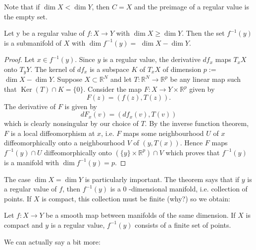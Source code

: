 \begin{remark}
    Note that if $\operatorname{dim} X<\operatorname{dim} Y$, then $C=X$ and the preimage of a regular value is the empty set.
\end{remark}

\begin{theorem}\label{thm:preimage}
    Let y be a regular value of $f: X \rightarrow Y$ with $\operatorname{dim} X \geq \operatorname{dim} Y$. Then the set $f^{-1}(y)$ is a submanifold of $X$ with $\operatorname{dim} f^{-1}(y)=$ $\operatorname{dim} X-\operatorname{dim} Y$.
\end{theorem}
\begin{proof}
    Let $x \in f^{-1}(y)$. Since $y$ is a regular value, the derivative $d f_{x}$ maps $T_{x} X$ onto $T_{y} Y$. The kernel of $d f_{x}$ is a subspace $K$ of $T_{x} X$ of dimension $p:=$ $\operatorname{dim} X-\operatorname{dim} Y$. Suppose $X \subset \mathbb{R}^{N}$ and let $T: \mathbb{R}^{N} \rightarrow \mathbb{R}^{p}$ be any linear map such that $\operatorname{Ker}(T) \cap K=\{0\}$. Consider the map $F: X \rightarrow Y \times \mathbb{R}^{p}$ given by
$$
F(z)=(f(z), T(z)).
$$
The derivative of $F$ is given by
$$
d F_{x}(v)=\left(d f_{x}(v), T(v)\right)
$$
which is clearly nonsingular by our choice of $T$. By the inverse function theorem, $F$ is a local diffeomorphism at $x$, i.e. $F$ maps some neighbourhood $U$ of $x$ diffeomorphically onto a neighbourhood $V$ of $(y, T(x))$. Hence $F$ maps $f^{-1}(y) \cap U$ diffeomorphically onto $\left(\{y\} \times \mathbb{R}^{p}\right) \cap V$ which proves that $f^{-1}(y)$ is a manifold with $\operatorname{dim} f^{-1}(y)=p$.
\end{proof}

The case $\operatorname{dim} X=\operatorname{dim} Y$ is particularly important. The theorem says that if $y$ is a regular value of $f$, then $f^{-1}(y)$ is a 0 -dimensional manifold, i.e. collection of points. If $X$ is compact, this collection must be finite (why?) so we obtain:

\begin{corollary}
    Let $f: X \rightarrow Y$ be a smooth map between manifolds of the same dimension. If $X$ is compact and $y$ is a regular value, $f^{-1}(y)$ consists of a finite set of points.
\end{corollary}

We can actually say a bit more:

